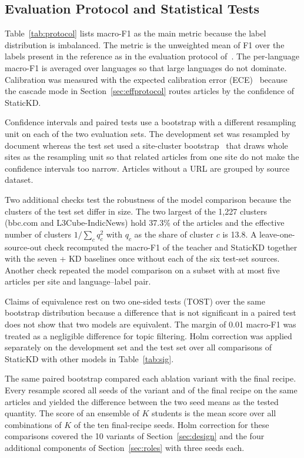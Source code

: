 \documentclass{ieeeaccess}
\begin{document}
\subsection{Evaluation Protocol and Statistical Tests}
\label{sec:protocol}
Table~\ref{tab:protocol} lists macro-F1 as the main metric because the label distribution is imbalanced. The metric is the unweighted mean of F1 over the labels present in the reference as in the evaluation protocol of~\cite{kuzman2025llm}. The per-language macro-F1 is averaged over languages so that large languages do not dominate. Calibration was measured with the expected calibration error (ECE)~\cite{guo2017calibration} because the cascade mode in Section~\ref{sec:effprotocol} routes articles by the confidence of StaticKD.

Confidence intervals and paired tests use a bootstrap with a different resampling unit on each of the two evaluation sets. The development set was resampled by document whereas the test set used a site-cluster bootstrap~\cite{field2007bootstrapping} that draws whole sites as the resampling unit so that related articles from one site do not make the confidence intervals too narrow. Articles without a URL are grouped by source dataset.

Two additional checks test the robustness of the model comparison because the clusters of the test set differ in size. The two largest of the 1,227 clusters (bbc.com and L3Cube-IndicNews) hold 37.3\% of the articles and the effective number of clusters $1/\sum_c q_c^{2}$ with $q_c$ as the share of cluster $c$ is 13.8. A leave-one-source-out check recomputed the macro-F1 of the teacher and StaticKD together with the seven + KD baselines once without each of the six test-set sources. Another check repeated the model comparison on a subset with at most five articles per site and language--label pair.

Claims of equivalence rest on two one-sided tests (TOST) over the same bootstrap distribution because a difference that is not significant in a paired test does not show that two models are equivalent. The margin of 0.01 macro-F1 was treated as a negligible difference for topic filtering. Holm correction was applied separately on the development set and the test set over all comparisons of StaticKD with other models in Table~\ref{tab:sig}.

The same paired bootstrap compared each ablation variant with the final recipe. Every resample scored all seeds of the variant and of the final recipe on the same articles and yielded the difference between the two seed means as the tested quantity. The score of an ensemble of $K$ students is the mean score over all combinations of $K$ of the ten final-recipe seeds. Holm correction for these comparisons covered the 10 variants of Section~\ref{sec:design} and the four additional components of Section~\ref{sec:roles} with three seeds each.
\end{document}
